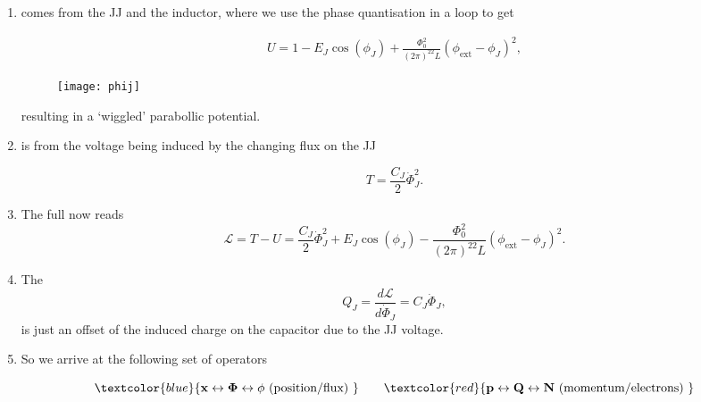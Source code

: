 \begin{enumerate}
\item {} comes  from the JJ and the
  inductor, where we use the phase quantisation in a loop to get

  {\begin{equation}
      \label{l3-energy1}
      \begin{aligned}
        U          =           1          -E_J\cos(\phi_J)          +
        \frac{\Phi_0^2}{(2\pi)^22L}(\phi_\text{ext}-\phi_J)^2,
      \end{aligned}
    \end{equation}}
  \begin{figure}[h]
    \centering \texttt{[image: phij]}
  \end{figure}

  \noindent
  \noindent resulting in a `wiggled' parabollic potential.

\item {} is from  the voltage
  being induced by the changing flux on the JJ

  \begin{equation}\label{key}
    T = \frac{C_J}{2}\dot{\Phi}_J^2.
  \end{equation}

\item The full  now reads
  \begin{equation}\label{key}
    \mathcal{L} = T - U = \frac{C_J}{2}\dot{\Phi}_J^2 + E_J\cos(\phi_J) - \frac{\Phi_0^2}{(2\pi)^22L}(\phi_\text{ext}-\phi_J)^2.
  \end{equation}

\item The \textbf{}
  \begin{equation}\label{key}
    Q_J = \frac{d\mathcal{L}}{d\dot{\Phi}_J} = C_J\dot{\Phi}_J,
  \end{equation}
  \noindent is just an offset of  the induced charge on the capacitor
  due to the JJ voltage.

\item So we arrive at the following set of operators

  \begin{equation}
    { \textcolor{blue}{\mathbf{x\leftrightarrow \Phi \leftrightarrow \phi} \text{ (position/flux) }}\qquad \textcolor{red}{\mathbf{p\leftrightarrow Q \leftrightarrow N \text{ (momentum/electrons) }}}}
  \end{equation}


\end{enumerate}
